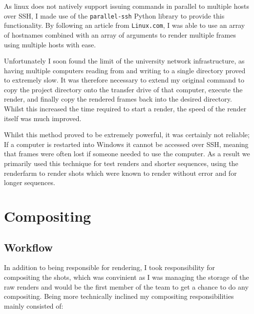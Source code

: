 \documentclass[11pt]{article}
\begin{document}
As linux does not natively support issuing commands in parallel to multiple hosts over SSH, I made use of the \texttt{parallel-ssh}\cite{pssh} Python library to provide this functionality. By following an article from \texttt{Linux.com}\cite{martin_2008}, I was able to use an array of hostnames combined with an array of arguments to render multiple frames using multiple hosts with ease.

Unfortunately I soon found the limit of the university network infrastructure, as having multiple computers reading from and writing to a single directory proved to extremely slow. It was therefore necessary to extend my original command to copy the project directory onto the transfer drive of that computer, execute the render, and finally copy the rendered frames back into the desired directory. Whilst this increased the time required to start a render, the speed of the render itself was much improved.

Whilst this method proved to be extremely powerful, it was certainly not reliable; If a computer is restarted into Windows it cannot be accessed over SSH, meaning that frames were often lost if someone needed to use the computer. As a result we primarily used this technique for test renders and shorter sequences, using the renderfarm to render shots which were known to render without error and for longer sequences.


\cite{martin_2008}

\section{Compositing}


\subsection{Workflow}

In addition to being responsible for rendering, I took responsibility for compositing the shots, which was convinient as I was managing the storage of the raw renders and would be the first member of the team to get a chance to do any compositing. Being more technically inclined my compositing responsibilities mainly consisted of:
\end{document}
